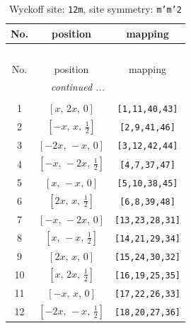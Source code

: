 \documentclass[fleqn,8pt]{jsarticle}
\begin{document}
\begin{longtable}{ccc}
\caption{Wyckoff site: {\tt 12m}, site symmetry: {\tt m'm'2}}
 \\
 \hline \hline
No. & position & mapping \\ \hline \endfirsthead

\multicolumn{2}{l}{\tablename\ \thetable{}} \\
 \hline \hline
No. & position & mapping \\ \hline \endhead

 \hline \hline
\multicolumn{2}{r}{\footnotesize\it continued ...} \\ \endfoot

 \hline \hline
\multicolumn{2}{r}{} \\ \endlastfoot

1 & $\left[ x,\, 2 x,\, 0 \right]$ & {\tt [1,11,40,43]} \\ \hline
2 & $\left[ - x,\, x,\, \frac{1}{2} \right]$ & {\tt [2,9,41,46]} \\ \hline
3 & $\left[ - 2 x,\, - x,\, 0 \right]$ & {\tt [3,12,42,44]} \\ \hline
4 & $\left[ - x,\, - 2 x,\, \frac{1}{2} \right]$ & {\tt [4,7,37,47]} \\ \hline
5 & $\left[ x,\, - x,\, 0 \right]$ & {\tt [5,10,38,45]} \\ \hline
6 & $\left[ 2 x,\, x,\, \frac{1}{2} \right]$ & {\tt [6,8,39,48]} \\ \hline
7 & $\left[ - x,\, - 2 x,\, 0 \right]$ & {\tt [13,23,28,31]} \\ \hline
8 & $\left[ x,\, - x,\, \frac{1}{2} \right]$ & {\tt [14,21,29,34]} \\ \hline
9 & $\left[ 2 x,\, x,\, 0 \right]$ & {\tt [15,24,30,32]} \\ \hline
10 & $\left[ x,\, 2 x,\, \frac{1}{2} \right]$ & {\tt [16,19,25,35]} \\ \hline
11 & $\left[ - x,\, x,\, 0 \right]$ & {\tt [17,22,26,33]} \\ \hline
12 & $\left[ - 2 x,\, - x,\, \frac{1}{2} \right]$ & {\tt [18,20,27,36]} \\
\end{longtable}
\renewcommand{\arraystretch}{1.2}
\end{document}
